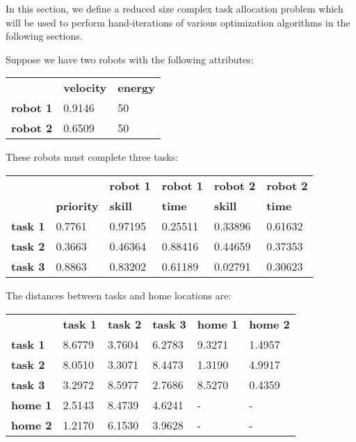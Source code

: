 \documentclass[a4paper]{article}
\begin{document}


In this section, we define a reduced size complex task allocation problem which
will be used to perform hand-iterations of various optimization algorithms in
the following sections.

Suppose we have two robots with the following attributes:

\begin{tabular}{lll}
        & \textbf{velocity} & \textbf{energy} \\
\textbf{robot 1} & 0.9146   & 50          \\
\textbf{robot 2} & 0.6509   & 50
\end{tabular}
\vspace{1em}

These robots must complete three tasks:

\begin{tabular}{llllll}
                &                   & \textbf{robot 1} & \textbf{robot 1} & \textbf{robot 2} & \textbf{robot 2} \\
                & \textbf{priority} & \textbf{skill}   & \textbf{time}    & \textbf{skill}   & \textbf{time} \\
\textbf{task 1} & 0.7761            & 0.97195          & 0.25511          & 0.33896          & 0.61632       \\
\textbf{task 2} & 0.3663            & 0.46364          & 0.88416          & 0.44659          & 0.37353       \\
\textbf{task 3} & 0.8863            & 0.83202          & 0.61189          & 0.02791          & 0.30623
\end{tabular}
\vspace{1em}

The distances between tasks and home locations are:



\begin{tabular}{llllll}
                & \textbf{task 1} & \textbf{task 2} & \textbf{task 3} & \textbf{home 1} & \textbf{home 2} \\
\textbf{task 1} & 8.6779          & 3.7604          & 6.2783          & 9.3271          & 1.4957 \\
\textbf{task 2} & 8.0510          & 3.3071          & 8.4473          & 1.3190          & 4.9917 \\
\textbf{task 3} & 3.2972          & 8.5977          & 2.7686          & 8.5270          & 0.4359 \\
\textbf{home 1} & 2.5143          & 8.4739          & 4.6241          &    -            &    -   \\
\textbf{home 2} & 1.2170          & 6.1530          & 3.9628          &    -            &    -
\end{tabular}
\end{document}
